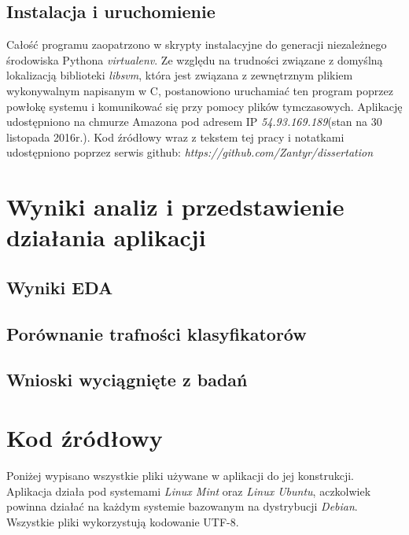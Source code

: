 \documentclass[12pt,a4paper,oneside]{report} %
\begin{document}
\section{Instalacja i uruchomienie}

Całość programu zaopatrzono w skrypty instalacyjne do generacji niezależnego środowiska Pythona \emph{virtualenv}. Ze względu na trudności związane z domyślną lokalizacją biblioteki \emph{libsvm}, która jest związana z zewnętrznym plikiem wykonywalnym napisanym w C, postanowiono uruchamiać ten program poprzez powłokę systemu i komunikować się przy pomocy plików tymczasowych. Aplikację udostępniono na chmurze Amazona pod adresem IP \emph{54.93.169.189}(stan na 30 listopada 2016r.). Kod źródłowy wraz z tekstem tej pracy i notatkami udostępniono poprzez serwis github: \emph{https://github.com/Zantyr/dissertation}\par










\chapter{Wyniki analiz i przedstawienie działania aplikacji}
\section{Wyniki EDA}
\section{Porównanie trafności klasyfikatorów}
\section{Wnioski wyciągnięte z badań}











\chapter{Kod źródłowy}
Poniżej wypisano wszystkie pliki używane w aplikacji do jej konstrukcji. Aplikacja działa pod systemami \emph{Linux Mint} oraz \emph{Linux Ubuntu}, aczkolwiek powinna działać na każdym systemie bazowanym na dystrybucji \emph{Debian}. Wszystkie pliki wykorzystują kodowanie UTF-8.
\end{document}
